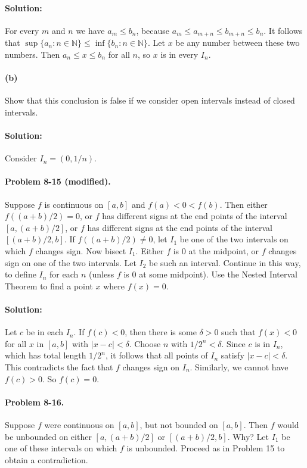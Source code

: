 \documentclass{article}
\begin{document}
\paragraph{Solution:} For every $m$ and $n$ we have $a_m \leq b_n$, because
$a_m \leq a_{m+n} \leq b_{m+n} \leq b_n$. It follows that $\sup\{a_n: n \in
\mathbb{N}\} \leq \inf\{b_n: n \in \mathbb{N}\}$. Let $x$ be any number between
these two numbers. Then $a_n \leq x \leq b_n$ for all $n$, so $x$ is in every
$I_n$.

\paragraph{(b)} Show that this conclusion is false if we consider open
intervals instead of closed intervals.

\paragraph{Solution:} Consider $I_n = (0, 1/n)$.

\paragraph{Problem 8-15 (modified).} Suppose $f$ is continuous on $[a, b]$ and
$f(a) < 0 < f(b)$. Then either $f((a + b)/2) = 0$, or $f$ has different signs
at the end points of the interval $[a, (a + b)/2]$, or $f$ has different signs
at the end points of the interval $[(a + b)/2, b]$. If $f((a + b)/2) \neq 0$,
let $I_1$ be one of the two intervals on which $f$ changes sign. Now bisect
$I_1$.  Either $f$ is 0 at the midpoint, or $f$ changes sign on one of the two
intervals. Let $I_2$ be such an interval. Continue in this way, to define $I_n$
for each $n$ (unless $f$ is 0 at some midpoint). Use the Nested Interval
Theorem to find a point $x$ where $f(x) = 0$.

\paragraph{Solution:} Let $c$ be in each $I_n$. If $f(c) < 0$, then there is
some $\delta > 0$ such that $f(x) < 0$ for all $x$ in $[a, b]$ with $|x - c| <
\delta$. Choose $n$ with $1/2^n < \delta$. Since $c$ is in $I_n$, which has
total length $1/2^n$, it follows that all points of $I_n$ satisfy $|x - c| <
\delta$. This contradicts the fact that $f$ changes sign on $I_n$. Similarly,
we cannot have $f(c) > 0$. So $f(c) = 0$.

\paragraph{Problem 8-16.} Suppose $f$ were continuous on $[a, b]$, but not
bounded on $[a, b]$. Then $f$ would be unbounded on either $[a, (a + b)/2]$ or
$[(a + b)/2, b]$. Why? Let $I_1$ be one of these intervals on which $f$ is
unbounded. Proceed as in Problem 15 to obtain a contradiction.
\end{document}
